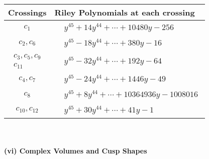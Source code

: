 \documentclass[1p]{elsarticle_modified}
\theoremstyle{definition}
\begin{document}
\begin{tabular}{m{50pt}|m{274pt}}
Crossings & \hspace{64pt}Riley Polynomials at each crossing \\
\hline $$\begin{aligned}c_{1}\end{aligned}$$&$\begin{aligned}
&y^{45}+14 y^{44}+\cdots+10480 y-256
\end{aligned}$\\
\hline $$\begin{aligned}c_{2},c_{6}\end{aligned}$$&$\begin{aligned}
&y^{45}-18 y^{44}+\cdots+380 y-16
\end{aligned}$\\
\hline $$\begin{aligned}c_{3},c_{5},c_{9}\\c_{11}\end{aligned}$$&$\begin{aligned}
&y^{45}-32 y^{44}+\cdots+192 y-64
\end{aligned}$\\
\hline $$\begin{aligned}c_{4},c_{7}\end{aligned}$$&$\begin{aligned}
&y^{45}-24 y^{44}+\cdots+1446 y-49
\end{aligned}$\\
\hline $$\begin{aligned}c_{8}\end{aligned}$$&$\begin{aligned}
&y^{45}+8 y^{44}+\cdots+10364936 y-1008016
\end{aligned}$\\
\hline $$\begin{aligned}c_{10},c_{12}\end{aligned}$$&$\begin{aligned}
&y^{45}+30 y^{44}+\cdots+41 y-1
\end{aligned}$\\
\hline
\end{tabular}\\~\\
\newpage\flushleft \textbf{(vi) Complex Volumes and Cusp Shapes}
\end{document}
